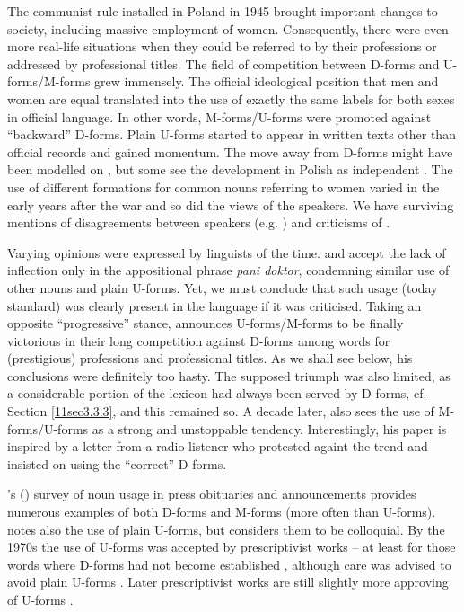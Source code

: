 \documentclass[output=paper,colorlinks,citecolor=brown]{langscibook}
\begin{document}
The communist rule installed in Poland in 1945 brought important changes to society, including massive employment of women. Consequently, there were even more real-life situations when they could be referred to by their professions or addressed by professional titles. The field of competition between D-forms and U-forms/M-forms grew immensely. The official ideological position that men and women are equal translated into the use of exactly the same labels for both sexes in official language. In other words, M-forms/U-forms were promoted against ``backward'' D-forms. Plain U-forms started to appear in written texts other than official records \citep[3--4]{obrebska-jablonska1949} and gained momentum. The move away from D-forms might have been modelled on  \citep[305]{wozniak2014}, but some see the development in Polish as independent \citep[250]{lazinski2006}. The use of different formations for common nouns referring to women varied in the early years after the war and so did the views of the speakers. We have surviving mentions of disagreements between speakers (e.g. \citealt{doroszewski1951}) and criticisms of .

Varying opinions were expressed by linguists of the time. \citet[60, 62]{pawlowski1951} and \citet[65]{nitsch1951} accept the lack of inflection only in the appositional phrase \emph{pani doktor}, condemning similar use of other nouns and plain U-forms. Yet, we must conclude that such usage (today standard) was clearly present in the language if it was criticised. Taking an opposite ``progressive'' stance, \citet{klemensiewicz1957} announces U-forms/M-forms to be finally victorious in their long competition against D-forms among words for (prestigious) professions and professional titles. As we shall see below, his conclusions were definitely too hasty. The supposed triumph was also limited, as a considerable portion of the  lexicon had always been served by D-forms, cf. Section \ref{11sec3.3.3}, and this remained so. A decade later, \citet{kupiszewski1967} also sees the use of M-forms/U-forms as a strong and unstoppable tendency. Interestingly, his paper is inspired by a letter from a radio listener who protested againt the trend and insisted on using the ``correct'' D-forms.

\citeauthor{kucala1978}'s (\citeyear[51--61]{kucala1978}) survey of noun usage in press obituaries and announcements provides numerous examples of both D-forms and M-forms (more often than U-forms). \citet[61]{kucala1978} notes also the use of plain U-forms, but considers them to be colloquial. By the 1970s the use of U-forms was accepted by prescriptivist works -- at least for those words where D-forms had not become established \citep[111]{buttlerkurkowskasatkiewicz1973}, although care was advised to avoid plain U-forms \citep[116]{buttlerkurkowskasatkiewicz1973}. Later prescriptivist works are still slightly more approving of U-forms \citep[128--129]{jadacka2006}.
\end{document}
